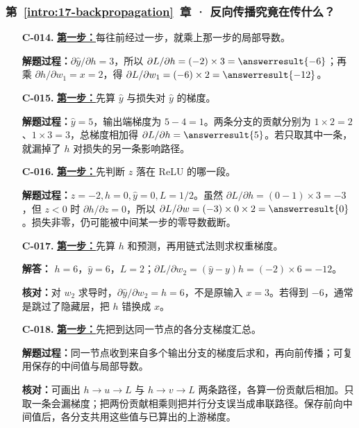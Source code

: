 \subsubsection*{第~\ref*{intro:17-backpropagation}~章 · 反向传播究竟在传什么？}
\begin{enumerate}[label={},leftmargin=4.8em,itemsep=4pt]
\item[\textbf{C-014.}] \leavevmode{}\label{solution:C-014}\label{solution:local-chain-gradient}\hyperref[exercise:local-chain-gradient]{\textbf{第一步：}}每往前经过一步，就乘上那一步的局部导数。\par\nobreak
\textbf{解题过程：}$\partial\widehat{y}/\partial h=3$，所以 $\partial L/\partial h=(-2)\times3=\answerresult{-6}$；再乘 $\partial h/\partial w_1=x=2$，得 $\partial L/\partial w_1=(-6)\times2=\answerresult{-12}$。
\item[\textbf{C-015.}] \leavevmode{}\label{solution:C-015}\label{solution:branch-gradient-sum}\hyperref[exercise:branch-gradient-sum]{\textbf{第一步：}}先算 $\widehat{y}$ 与损失对 $\widehat{y}$ 的梯度。\par\nobreak
\textbf{解题过程：}$\widehat{y}=5$，输出端梯度为 $5-4=1$。两条分支的贡献分别为 $1\times2=2$、$1\times3=3$，总梯度相加得 $\partial L/\partial h=\answerresult{5}$。若只取其中一条，就漏掉了 $h$ 对损失的另一条影响路径。
\item[\textbf{C-016.}] \leavevmode{}\label{solution:C-016}\label{solution:relu-blocked-gradient}\hyperref[exercise:relu-blocked-gradient]{\textbf{第一步：}}先判断 $z$ 落在 ReLU 的哪一段。\par\nobreak
\textbf{解题过程：}$z=-2,h=0,\widehat{y}=0,L=1/2$。虽然 $\partial L/\partial h=(0-1)\times3=-3$，但 $z<0$ 时 $\partial h/\partial z=0$，所以 $\partial L/\partial w=(-3)\times0\times2=\answerresult{0}$。损失非零，仍可能被中间某一步的零导数截断。
\item[\textbf{C-017.}] \leavevmode{}\label{solution:C-017}\label{solution:scalar-chain-forward}\hyperref[exercise:scalar-chain-forward]{\textbf{第一步：}}先算 $h$ 和预测，再用链式法则求权重梯度。\par\nobreak
\textbf{解答：} $h=6$，$\widehat{y}=6$，$L=2$；$\partial L/\partial w_2=(\widehat{y}-y)h=(-2)\times6=-12$。\par\textbf{核对：}对 $w_2$ 求导时，$\partial\widehat{y}/\partial w_2=h=6$，不是原输入 $x=3$。若得到 $-6$，通常是跳过了隐藏层，把 $h$ 错换成 $x$。
\item[\textbf{C-018.}] \leavevmode{}\label{solution:C-018}\label{solution:branch-gradient-reuse}\hyperref[exercise:branch-gradient-reuse]{\textbf{第一步：}}先把到达同一节点的各分支梯度汇总。\par\nobreak\textbf{解题过程：}同一节点收到来自多个输出分支的梯度后求和，再向前传播；可复用保存的中间值与局部导数。\par\textbf{核对：}可画出 $h\to u\to L$ 与 $h\to v\to L$ 两条路径，各算一份贡献后相加。只取一条会漏梯度；把两份贡献相乘则把并行分支误当成串联路径。保存前向中间值后，各分支共用这些值与已算出的上游梯度。
\end{enumerate}
